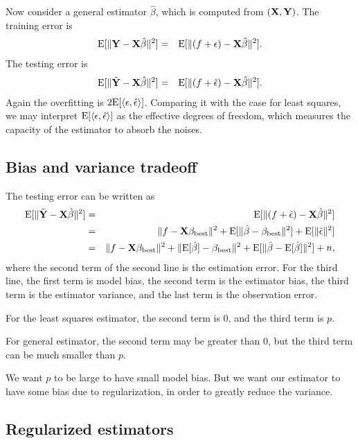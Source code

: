 \documentclass[11pt]{article}
\newcommand{\E}{\mathbb{E}}
\def\E{{\rm E}}
\def\X{{\bf X}}
\def\Y{{\bf Y}}
\begin{document}
Now consider a general estimator $\hat{\beta}$, which is computed from $(\X, \Y)$. The training error is 
\begin{eqnarray*}
    \E[\|\Y - \X \hat{\beta}\|^2] &=& \E[\|(f + \epsilon) - \X \hat{\beta}\|^2]. 
 \end{eqnarray*}
The testing error is 
\begin{eqnarray*}
    \E[\|\tilde{\Y} - \X \hat{\beta}\|^2] &=& \E[\|(f + \tilde{\epsilon}) - \X \hat{\beta}\|^2]. 
 \end{eqnarray*}
Again the overfitting is $2\E[\langle \epsilon, \hat{\epsilon}\rangle]$. Comparing it with the case for least squares, we may interpret $\E[\langle \epsilon, \hat{\epsilon}\rangle]$ as the effective degrees of freedom, which measures the capacity of the estimator to absorb the noises. 

\subsection{Bias and variance tradeoff} 

The testing error can be written as 
\begin{eqnarray*}
    \E[\|\tilde{\Y} - \X \hat{\beta}\|^2] &=& \E[\|(f + \tilde{\epsilon}) - \X \hat{\beta}\|^2] \\
    &=& \|f - \X \beta_{\rm best}\|^2 + \E[\|\hat{\beta} - \beta_{\rm best}\|^2]  + \E[\|\tilde{\epsilon}\|^2]\\
    &=&  \|f - \X \beta_{\rm best}\|^2  + \|\E[\hat{\beta}] - \beta_{\rm best}\|^2 + \E[\|\hat{\beta}-\E[\hat{\beta}]\|^2] + n, 
 \end{eqnarray*}
where the second term of the second line is the estimation error. For the third line, the first term is model bias, the second term is the estimator bias,  the third term is the estimator  variance, and the last term is the observation error. 

For the least squares estimator, the second term is 0, and the third term is $p$. 

For general estimator, the second term may be greater than 0, but the third term can be much smaller than $p$. 

We want $p$ to be large to have small model bias. But we want our estimator to have some bias due to regularization, in order to greatly reduce the variance. 

\subsection{Regularized estimators} 
\end{document}
